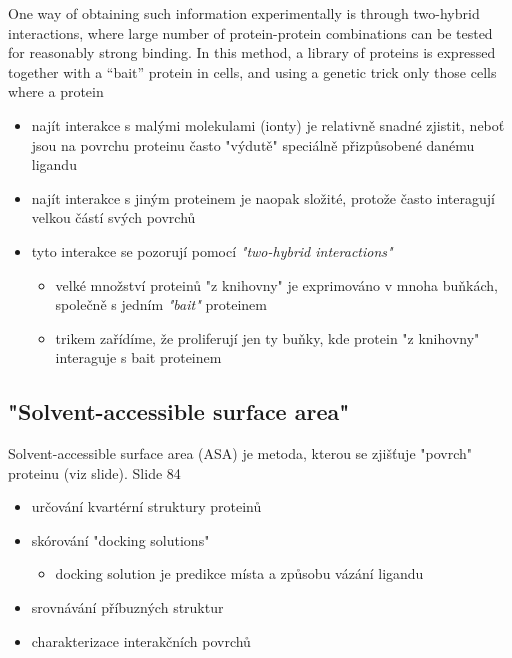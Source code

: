 \documentclass[DIV=8]{scrreprt}
\begin{document}
One way of obtaining such information experimentally is through two-hybrid interactions, where large number of protein-protein combinations can be tested for reasonably strong binding. In this method, a library of proteins is expressed together with a “bait” protein in cells, and using a genetic trick only those cells where a protein

\begin{itemize}
    \item najít interakce s malými molekulami (ionty) je relativně snadné zjistit, neboť jsou na povrchu proteinu často "výdutě" speciálně přizpůsobené danému ligandu
    \item najít interakce s jiným proteinem je naopak složité, protože často interagují velkou částí svých povrchů
    \item tyto interakce se pozorují pomocí \emph{"two-hybrid interactions"}
\begin{itemize}
    \item velké množství proteinů "z knihovny" je exprimováno v mnoha buňkách, společně s jedním \emph{"bait"} proteinem
    \item trikem zařídíme, že proliferují jen ty buňky, kde protein "z knihovny" interaguje s bait proteinem
\end{itemize}

\end{itemize}


\subsection{"Solvent-accessible surface area"}

Solvent-accessible surface area (ASA) je metoda, kterou se zjišťuje "povrch" proteinu (viz slide). Slide 84

\begin{itemize}
    \item určování kvartérní struktury proteinů
    \item skórování "docking solutions"
\begin{itemize}
    \item docking solution je predikce místa a způsobu vázání ligandu
\end{itemize}

    \item srovnávání příbuzných struktur
    \item charakterizace interakčních povrchů
\end{itemize}
\end{document}
